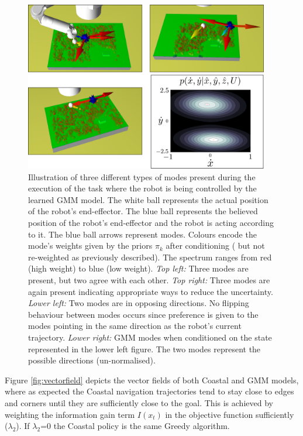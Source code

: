 \begin{figure}[h!]
    \centering
    \includegraphics[width=0.95\textwidth]{./ch3-Search/Figures/Figure9}
    \caption{Illustration of three different types of modes present during the
    execution of the task where the robot is being controlled by the learned GMM model.
    The white ball represents the actual position of the robot's end-effector. The blue ball represents the
    believed position of the robot's end-effector and the robot is acting according to it. 
    The blue ball arrows represent modes. Colours encode the mode's weights given by the priors $\pi_{k}$ after conditioning ( but not re-weighted as
    previously described). The spectrum ranges from red (high weight) to blue (low weight). \textit{Top left:} Three modes are present, but two agree with each other.   
    \textit{Top right:} Three modes are again present indicating appropriate ways to reduce the uncertainty. \textit{Lower left:} Two modes are in opposing directions. 
    No flipping behaviour between modes occurs since preference is given to the modes pointing in the same direction as the robot's current trajectory. \textit{Lower right:} GMM modes when conditioned on the state represented in the lower left figure.
    The two modes represent the possible directions (un-normalised).}
   \label{fig:modes}
\end{figure}

Figure \ref{fig:vectorfield} depicts the vector fields of both Coastal and GMM models, where as expected the Coastal navigation 
trajectories tend to stay close to edges and corners until they are sufficiently close to the goal. This is achieved by weighting 
the information gain term $I(x_t)$ in the objective function sufficiently ($\lambda_2$). If $\lambda_2$=0 the Coastal policy is 
the same Greedy algorithm. 



